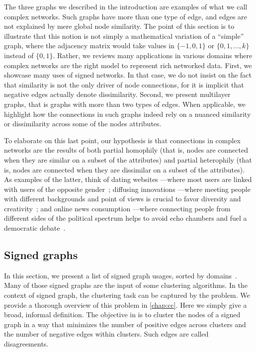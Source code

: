 The three graphs we described in the introduction are examples of what we call complex networks.
Such graphs have more than one type of edge, and edges are not explained by mere global node
similarity. The point of this section is to illustrate that this notion is not simply a mathematical
variation of a \enquote{simple} graph, where the adjacency matrix would take values in $\{-1, 0, 1\}$ or
$\{0, 1, \ldots, k\}$ instead of $\{0, 1\}$. Rather, we reviews many applications in various domains
where complex networks are the right model to represent rich networked data. First, we showcase many
uses of signed networks. In that case, we do not insist on the fact that similarity is not the only
driver of node connections, for it is implicit that negative edges actually denote dissimilarity.
Second, we present multilayer graphs, that is graphs with more than two types of edges. When
applicable, we highlight how the connections in such graphs indeed rely on a nuanced similarity or
dissimilarity across some of the nodes attributes.

To elaborate on this last point, our hypothesis is that connections in complex networks are the
results of both partial homophily (that is, nodes are connected when they are similar on a subset of
the attributes) and partial heterophily (that is, nodes are connected when they are dissimilar on a
subset of the attributes). As examples of the latter, think of dating websites ---where most users
are linked with users of the opposite gender~\autocites{homophilyMyspace09}{Tinder16}; diffusing
innovations ---where meeting people with different backgrounds and point of views is crucial to
favor diversity and creativity~\autocite{rogers2003diffusion}; and online news consumption ---where
connecting people from different sides of the political spectrum helps to avoid echo chambers and
fuel a democratic debate~\autocite{balancedNews17}.

\subsection{Signed graphs}
\label{sub:intro_signed_graphs}

In this section, we present a list of signed graph usages, sorted by domains~\autocite{Tang2015a}. Many of those signed
graphs are the input of some clustering algorithms. In the context of signed graph, the clustering
task can be captured by the \pcc{} problem. We provide a thorough overview of this problem in
\autoref{chap:cc}. Here we simply give a broad, informal definition. The objective in \pcc{} is to
cluster the nodes of a signed graph in a way that minimizes the number of positive edges across
clusters and the number of negative edges within clusters. Such edges are called disagreements.

